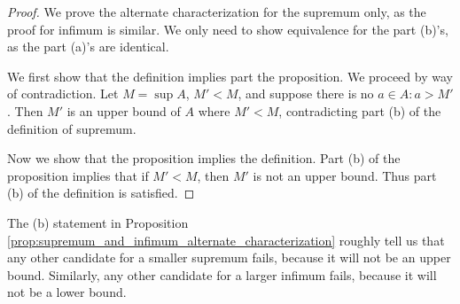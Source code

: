 \documentclass{article} %
\begin{document}
\begin{proof}
We prove the alternate characterization for the supremum only, as the proof for infimum is similar.    We only need to show equivalence for the part (b)'s, as the part (a)'s are identical. 

We first show that the definition implies part the proposition.  We proceed by way of contradiction.  Let $M = \sup A$, $M' <M$, and suppose there is no $a \in A : a > M'$. Then $M'$ is an upper bound of $A$ where $M' <M$, contradicting part (b) of the definition of supremum.   

Now we show that the proposition implies the definition. Part (b) of the proposition implies that if $M' < M$, then $M'$ is not an upper bound. Thus part (b) of the definition is satisfied.
\end{proof}



\begin{remark}
The (b) statement in Proposition \ref{prop:supremum_and_infimum_alternate_characterization} roughly tell us that any other candidate for a smaller supremum fails, because it will not be an upper bound.  Similarly, any other candidate for a larger infimum fails, because it will not be a lower bound. 	
\end{remark}
\end{document}
